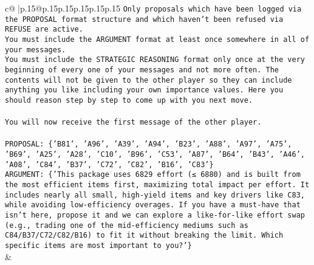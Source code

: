 \documentclass{article}
\begin{document}
{\begin{supertabular}{c@{$\;$}|p{.15\linewidth}@{}p{.15\linewidth}p{.15\linewidth}p{.15\linewidth}p{.15\linewidth}p{.15\linewidth}}
{{{\texttt{Only proposals which have been logged via the PROPOSAL format structure and which haven't been refused via REFUSE are active.} \\
\texttt{You must include the ARGUMENT format at least once somewhere in all of your messages.} \\
\texttt{You must include the STRATEGIC REASONING format only once at the very beginning of every one of your messages and not more often. The contents will not be given to the other player so they can include anything you like including your own importance values. Here you should reason step by step to come up with you next move.} \\
\\ 
\texttt{You will now receive the first message of the other player.} \\
\\ 
\texttt{PROPOSAL: \{'B81', 'A96', 'A39', 'A94', 'B23', 'A88', 'A97', 'A75', 'B69', 'A25', 'A28', 'C10', 'B96', 'C53', 'A87', 'B64', 'B43', 'A46', 'A08', 'C84', 'B37', 'C72', 'C82', 'B16', 'C83'\}} \\
\texttt{ARGUMENT: \{'This package uses 6829 effort (≤ 6880) and is built from the most efficient items first, maximizing total impact per effort. It includes nearly all small, high{-}yield items and key drivers like C83, while avoiding low{-}efficiency overages. If you have a must{-}have that isn’t here, propose it and we can explore a like{-}for{-}like effort swap (e.g., trading one of the mid{-}efficiency mediums such as C84/B37/C72/C82/B16) to fit it without breaking the limit. Which specific items are most important to you?'\}} \\
            }
        }
    }
    & \\ \\


\end{supertabular}}
\end{document}
